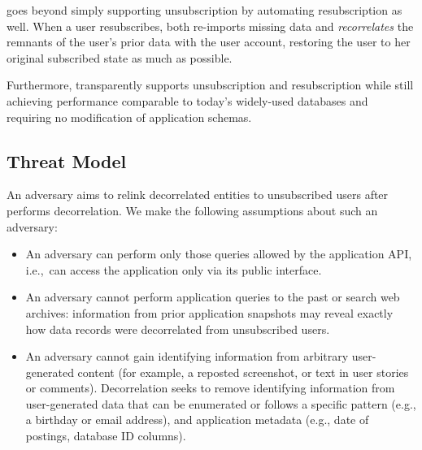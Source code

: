 %
\sys goes beyond simply supporting unsubscription by automating resubscription as well.
When a user resubscribes, \sys both re-imports missing data and
\emph{recorrelates} the remnants of the user's prior data with the user account,
restoring the user to her original subscribed state as much as possible.

Furthermore, \sys transparently supports unsubscription and resubscription while still achieving performance
comparable to today’s widely-used databases and requiring no modification of application schemas.


\subsection{Threat Model}
An adversary aims to relink decorrelated entities to unsubscribed users after \sys
performs decorrelation. We make the following assumptions about such an adversary:
\begin{itemize}
    \item An adversary can perform only those queries allowed by the application API,
i.e.,\ can access the application only via its public interface.

    \item An adversary cannot perform application queries to the past or search web archives:
    information from prior application snapshots may reveal
    exactly how data records were decorrelated from unsubscribed users.

    \item An adversary cannot gain identifying information from arbitrary user-generated content (for
        example, a reposted screenshot, or text in user stories or comments). Decorrelation seeks to
        remove identifying information from user-generated data that can be enumerated or follows a
        specific pattern (e.g., a birthday or email address), and application metadata (e.g., date
        of postings, database ID columns).
\end{itemize}

